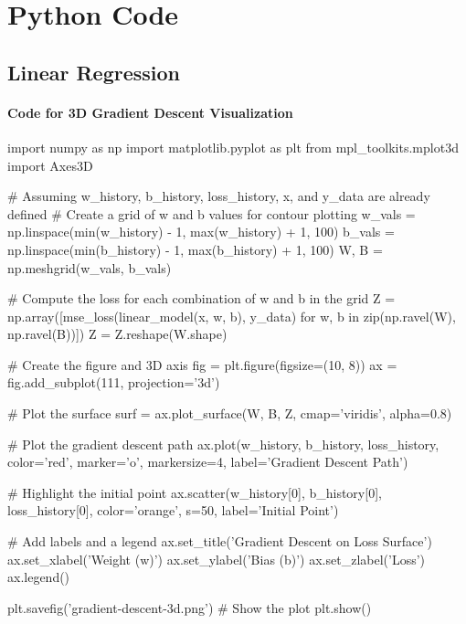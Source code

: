 %
%
%

\appendix
\chapter{Python Code}
\label{introA} %

\section{Linear Regression}

\subsubsection{Code for 3D Gradient Descent Visualization}
\label{sec:gradient-descent-3d}
\begin{codeblock}
import numpy as np
import matplotlib.pyplot as plt
from mpl_toolkits.mplot3d import Axes3D

# Assuming w_history, b_history, loss_history, x, and y_data are already defined
# Create a grid of w and b values for contour plotting
w_vals = np.linspace(min(w_history) - 1, max(w_history) + 1, 100)
b_vals = np.linspace(min(b_history) - 1, max(b_history) + 1, 100)
W, B = np.meshgrid(w_vals, b_vals)

# Compute the loss for each combination of w and b in the grid
Z = np.array([mse_loss(linear_model(x, w, b), y_data) for w, b in zip(np.ravel(W), np.ravel(B))])
Z = Z.reshape(W.shape)

# Create the figure and 3D axis
fig = plt.figure(figsize=(10, 8))
ax = fig.add_subplot(111, projection='3d')

# Plot the surface
surf = ax.plot_surface(W, B, Z, cmap='viridis', alpha=0.8)

# Plot the gradient descent path
ax.plot(w_history, b_history, loss_history, color='red', marker='o', markersize=4, label='Gradient Descent Path')

# Highlight the initial point
ax.scatter(w_history[0], b_history[0], loss_history[0], color='orange', s=50, label='Initial Point')

# Add labels and a legend
ax.set_title('Gradient Descent on Loss Surface')
ax.set_xlabel('Weight (w)')
ax.set_ylabel('Bias (b)')
ax.set_zlabel('Loss')
ax.legend()

plt.savefig('gradient-descent-3d.png')
# Show the plot
plt.show()

\end{codeblock}

